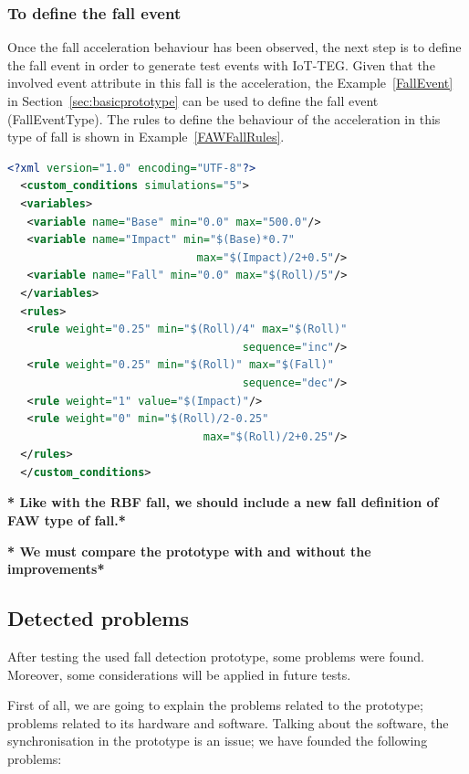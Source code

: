 \documentclass[conference]{IEEEtran}
\theoremstyle{definition}
\begin{document}
\subsubsection*{To define the fall event} Once the fall acceleration behaviour has been observed, the next step is to define the 
fall event in order to generate test events with IoT-TEG. Given that the involved event attribute in this fall is the acceleration, 
the Example~\ref{FallEvent} in Section~\ref{sec:basicprototype} can be used to define the fall event (FallEventType). The rules to
define the behaviour of the acceleration in this type of fall is shown in Example~\ref{FAWFallRules}.

\begin{lstlisting}[basicstyle=\ttfamily\footnotesize,language=XML,caption={Rules to define a FAW fall},label=FAWFallRules]
  <?xml version="1.0" encoding="UTF-8"?>
  <custom_conditions simulations="5">
  <variables>
   <variable name="Base" min="0.0" max="500.0"/>
   <variable name="Impact" min="$(Base)*0.7" 
                             max="$(Impact)/2+0.5"/>
   <variable name="Fall" min="0.0" max="$(Roll)/5"/>
  </variables>
  <rules>
   <rule weight="0.25" min="$(Roll)/4" max="$(Roll)" 
                                    sequence="inc"/>
   <rule weight="0.25" min="$(Roll)" max="$(Fall)" 
                                    sequence="dec"/>
   <rule weight="1" value="$(Impact)"/>
   <rule weight="0" min="$(Roll)/2-0.25" 
                              max="$(Roll)/2+0.25"/>
  </rules>
  </custom_conditions>
\end{lstlisting}

\textbf{* Like with the RBF fall, we should include a new fall definition of FAW type of fall.*}

\textbf{* We must compare the prototype with and without the improvements*}

\subsection{Detected problems}

After testing the used fall detection prototype, some problems were 
found. Moreover, some considerations will be applied in future tests.

First of all, we are going to explain the problems related to the prototype; problems related to its hardware and
software. Talking about the software, the synchronisation in the prototype is an issue; we have founded the following problems:
\end{document}
